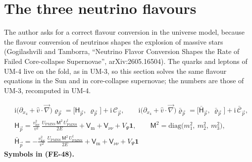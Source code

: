 \documentclass[
  10pt,
]{article}
\begin{document}
\hypertarget{the-three-neutrino-flavours}{%
\section{The three neutrino
flavours}\label{the-three-neutrino-flavours}}

The author asks for a correct flavour conversion in the universe model,
because the flavour conversion of neutrinos shapes the explosion of
massive stars (Gogilashvili and Tamborra, ``Neutrino Flavor Conversion
Shapes the Rate of Failed Core-collapse Supernovae'', arXiv:2605.16504).
The quarks and leptons of UM-4 live on the fold, as in UM-3, so this
section solves the same flavour equations in the Sun and in
core-collapse supernovae; the numbers are those of UM-3, recomputed in
UM-4.

\[
\begin{aligned}
&\mathrm{i}\big(\partial_{x_4} + \hat v\cdot\vec\nabla\big)\varrho_{\vec p} = \big[\mathsf{H}_{\vec p},\ \varrho_{\vec p}\big] + \mathrm{i}\,\mathcal{C}_{\vec p},\qquad
 \mathrm{i}\big(\partial_{x_4} + \hat v\cdot\vec\nabla\big)\bar\varrho_{\vec p} = \big[\bar{\mathsf{H}}_{\vec p},\ \bar\varrho_{\vec p}\big] + \mathrm{i}\,\bar{\mathcal{C}}_{\vec p},\\
&\mathsf{H}_{\vec p} = \frac{v_{\mathrm{loc}}^2}{v^2}\,\frac{U_{\mathrm{PMNS}}\,\mathsf{M}^2\,U_{\mathrm{PMNS}}^\dagger}{2E} + \mathsf{V}_{\mathrm{m}} + \mathsf{V}_{\nu\nu} + V_\Psi\mathbf{1},\qquad
 \mathsf{M}^2 = \mathrm{diag}\big(m_1^2,\ m_2^2,\ m_3^2\big),\\
&\bar{\mathsf{H}}_{\vec p} = -\frac{v_{\mathrm{loc}}^2}{v^2}\,\frac{U_{\mathrm{PMNS}}\,\mathsf{M}^2\,U_{\mathrm{PMNS}}^\dagger}{2E} + \mathsf{V}_{\mathrm{m}} + \mathsf{V}_{\nu\nu} + V_\Psi\mathbf{1}
\end{aligned} \tag{FE-48}
\] \textbf{Symbols in (FE-48).}
\end{document}
